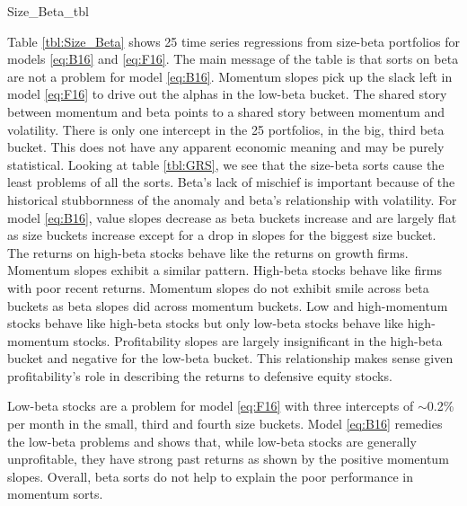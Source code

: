 
{Size_Beta_tbl}

Table \ref{tbl:Size_Beta} shows 25 time series regressions from size-beta
portfolios for models \ref{eq:B16} and \ref{eq:F16}. The main message of the
table is that sorts on beta are not a problem for model \ref{eq:B16}. Momentum
slopes pick up the slack left in model \ref{eq:F16} to drive out the alphas in
the low-beta bucket. The shared story between momentum and beta points to a
shared story between momentum and volatility. There is only one intercept in
the 25 portfolios, in the big, third beta bucket. This does not have any
apparent economic meaning and may be purely statistical. Looking at table
\ref{tbl:GRS}, we see that the size-beta sorts cause the least problems of all
the sorts. Beta's lack of mischief is important because of the historical
stubbornness of the anomaly \parencite{jensen1972capital}
and beta's relationship with volatility.
For model \ref{eq:B16}, value slopes decrease as beta buckets increase and are
largely flat as size buckets increase except for a drop in slopes for the
biggest size bucket.
The returns on high-beta stocks behave like the returns on growth firms.
Momentum slopes exhibit a similar pattern.
High-beta stocks behave like firms with poor recent returns.
Momentum slopes do not exhibit smile across beta buckets as beta slopes did
across momentum buckets.
Low and high-momentum stocks behave like high-beta stocks but only low-beta
stocks behave like high-momentum stocks.
Profitability slopes are largely insignificant in the high-beta bucket and
negative for the low-beta bucket.
This relationship makes sense given profitability's role in describing the
returns to defensive equity stocks.

Low-beta stocks are a problem for model \ref{eq:F16} with three intercepts of
$\sim$0.2\% per month in the small, third and fourth size buckets.
Model \ref{eq:B16} remedies the low-beta problems and shows that, while
low-beta stocks are generally unprofitable, they have strong past returns as
shown by the positive momentum slopes.
Overall, beta sorts do not help to explain the poor performance in momentum
sorts.
